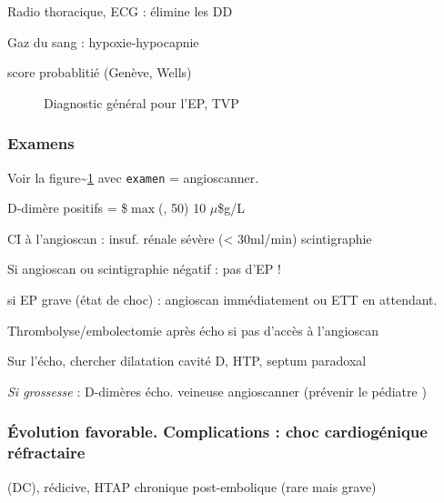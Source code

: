 \documentclass{book}
\begin{document}
Radio thoracique, ECG : élimine les DD

Gaz du sang : hypoxie-hypocapnie

\thus score probablitié (Genève, Wells)

\begin{figure}[htpb]
  \centering
  \caption{Diagnostic général pour l'EP, TVP}
  \label{fig:ep-diag}
\end{figure}


\subsubsection{Examens}
\label{sec:org021e41c}
Voir la figure\textasciitilde{}\ref{fig:ep-diag} avec \texttt{examen} = angioscanner.

D-dimère positifs = \$\(\max\)(, 50) \texttimes{} 10 \(\mu\)\$g/L

CI à l'angioscan : insuf. rénale sévère (< 30ml/min) \thus scintigraphie

Si angioscan ou scintigraphie négatif : pas d'EP !

\begin{tcolorbox}
\danger{} si EP grave (état de choc) : angioscan immédiatement ou ETT en
attendant.

\faBomb{} Thrombolyse/embolectomie après écho si pas d'accès à l'angioscan
\end{tcolorbox}

Sur l'écho, chercher dilatation cavité D, HTP, septum paradoxal

\emph{Si grossesse}  : D-dimères \thus écho. veineuse \thus angioscanner
(prévenir le pédiatre \faBomb)

\subsubsection{Évolution favorable. Complications : choc cardiogénique réfractaire}
\label{sec:orgc6d857d}
(DC), rédicive, HTAP chronique post-embolique (rare mais grave)
\end{document}
